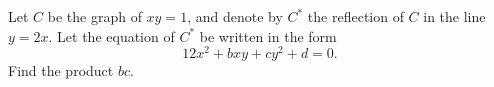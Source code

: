Let $C$ be the graph of $xy = 1$, and denote by $C^*$ the reflection of $C$ in the line $y = 2x$.  Let the equation of $C^*$ be written in the form
\[ 12x^2 + bxy + cy^2 + d = 0. \]
Find the product $bc$.